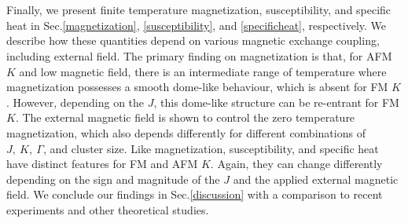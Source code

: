 \documentclass[aps,amsmath,twocolumn,amssymb,floatfix,showpacs,superscriptaddress,nofootinbib,longbibliography]{revtex4-1}
\begin{document}
\\\\\indent
Finally, we present finite temperature magnetization, susceptibility, and specific heat in Sec.\ref{magnetization}, \ref{susceptibility}, and \ref{specificheat}, respectively. We describe how these quantities depend on various magnetic exchange coupling, including external field. The primary finding on magnetization is that, for AFM $K$ and low magnetic field, there is an intermediate range of temperature where magnetization possesses a smooth dome-like behaviour, which is absent for FM $K$. However, depending on the $J$, this dome-like structure can be re-entrant for FM $K$. The external magnetic field is shown to control the zero temperature magnetization, which also depends differently for different combinations of $J,~K,~\Gamma$, and cluster size. Like magnetization, susceptibility, and specific heat have distinct features for FM and AFM $K$. Again, they can change differently depending on the sign and magnitude of the $J$ and the applied external magnetic field. We conclude our findings in Sec.\ref{discussion} with a comparison to recent experiments and other theoretical studies.
\end{document}
